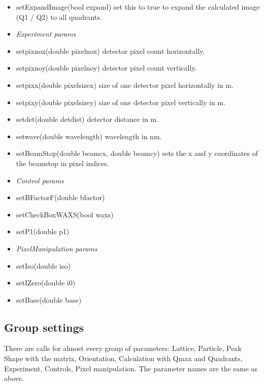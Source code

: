 \documentclass[11pt]{article} %
\begin{document}
\begin{itemize}
\item setExpandImage(bool expand) set this to true to expand the calculated image (Q1 / Q2) to all quadrants.
% 
\item[] {\it Experiment params}
\item setpixnox(double pixelnox) detector pixel count horizontally.
\item setpixnoy(double pixelnoy) detector pixel count vertically.
\item setpixx(double pixelsizex) size of one detector pixel horizontally in m.
\item setpixy(double pixelsizey) size of one detector pixel vertically in m.
\item setdet(double detdist) detector distance in m.
\item setwave(double wavelength) wavelength in nm.
\item setBeamStop(double beamcx, double beamcy) sets the x and y coordinates of the beamstop in pixel indices.
% 
\item[] {\it Control params}
\item setBFactorF(double bfactor)
\item setCheckBoxWAXS(bool waxs)
\item setP1(double p1)
% 
\item[] {\it PixelManipulation params}
\item setIso(double iso)
\item setIZero(double i0)
\item setBase(double base)
\end{itemize}


\subsection{Group settings}

There are calls for almost every group of parameters: Lattice, Particle, Peak Shape with the matrix, Orientation, Calculation with Qmax and Quadrants, Experiment, Controls, Pixel manipulation. The parameter names are the same as above.
\end{document}

